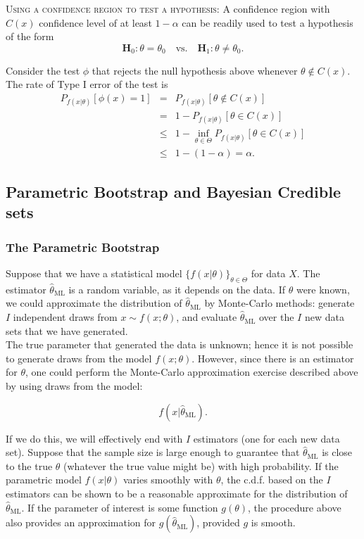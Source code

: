 \documentclass[11pt]{article} %
\begin{document}
{\scshape Using a confidence region to test a hypothesis:} A confidence region with $C(x)$ confidence level of at least $1-\alpha$ can be readily used to test a hypothesis of the form
\[ \mathbf{H}_0: \theta =\theta_0 \quad \textrm{vs.} \quad \mathbf{H}_1: \theta \neq \theta_0. \]

Consider the test $\phi$ that rejects the null hypothesis above whenever $\theta \notin C(x)$. The rate of Type I error of the test is 
\begin{eqnarray*}
P_{f(x| \theta)} [ \phi(x)=1 ]  &=&  P_{f(x| \theta)} [\theta \notin C(x)] \\
&=&   1-  P_{f(x| \theta)} [\theta \in C(x)]  \\
&\leq& 1- \inf_{\theta \in \Theta} P_{f(x| \theta)} [\theta \in C(x)] \\
&\leq& 1-(1-\alpha) =\alpha.
\end{eqnarray*}


\subsection{Parametric Bootstrap and Bayesian Credible sets}

\subsubsection{The Parametric Bootstrap}

Suppose that we have a statistical model $\{ f(x | \theta)\}_{\theta \in \Theta}$ for data $X$.  The estimator $\widehat{\theta}_{\textrm{ML}}$ is a random variable, as it depends on the data. If $\theta$ were known, we could approximate the distribution of $\widehat{\theta}_{\textrm{ML}}$ by Monte-Carlo methods: generate $I$ independent draws from $x \sim f(x;\theta)$, and evaluate $\widehat{\theta}_{\textrm{ML}}$ over the $I$ new data sets that we have generated.  \\


The true parameter that generated the data is unknown; hence it is not possible to generate draws from the model $f(x;\theta)$. However, since there is an estimator for $\theta$, one could perform the Monte-Carlo approximation exercise described above by using draws from the model:

\[ f(x | \widehat{\theta}_{\textrm{ML}}).\]

If we do this, we will effectively end with $I$ estimators (one for each new data set). Suppose that the sample size is large enough to guarantee that $\widehat{\theta}_{\textrm{ML}}$ is close to the true $\theta$ (whatever the true value might be) with high probability. If the parametric model $f(x | \theta)$ varies smoothly with $\theta$, the c.d.f. based on the $I$ estimators can be shown to be a reasonable approximate for the distribution of $\widehat{\theta}_{\textrm{ML}}$. If the parameter of interest is some function $g(\theta)$, the procedure above also provides an approximation for $g(\widehat{\theta}_{\textrm{ML}})$, provided $g$ is smooth. \\
\end{document}

